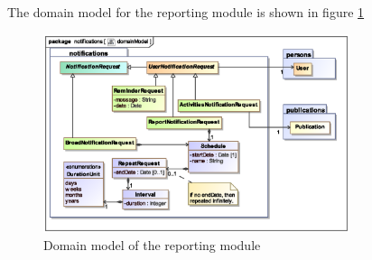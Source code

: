 The domain model for the reporting module is shown in figure \ref{fig:reporting_domainModel} 

\begin{figure}[htb]
\begin{center}
  \includegraphics[width=0.8\textwidth,height=0.4\textheight,keepaspectratio=true]{domainModel}
\end{center}
\caption{ Domain model of the reporting module \label{fig:reporting_domainModel}}
\end{figure}
 